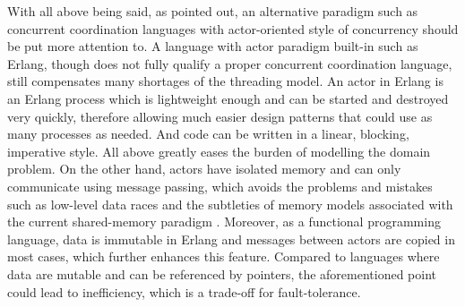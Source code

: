 With all above being said, as \textcite{Lee:2006:PT:1137232.1137289} pointed out, an alternative paradigm such as concurrent coordination languages with actor-oriented style of concurrency should be put more attention to. A language with actor paradigm built-in such as Erlang, though does not fully qualify a proper concurrent coordination language, still compensates many shortages of the threading model. An actor in Erlang is an Erlang process which is lightweight enough and can be started and destroyed very quickly, therefore allowing 
much easier design patterns that could use as many processes as needed. And code can be written in a linear, blocking, imperative style. All above greatly eases the burden of modelling the domain problem. On the other hand, actors have isolated memory and can only communicate using message passing, which avoids the problems and mistakes such as low-level data races and the subtleties of memory models associated with the current shared-memory paradigm \autocite{UCAM-CL-TR-769}. Moreover, as a functional programming language, data is immutable in Erlang and messages between actors are copied in most cases, which further enhances this feature. Compared to languages where data are mutable and can be referenced by pointers, the aforementioned point could lead to inefficiency, which is a trade-off for fault-tolerance.


